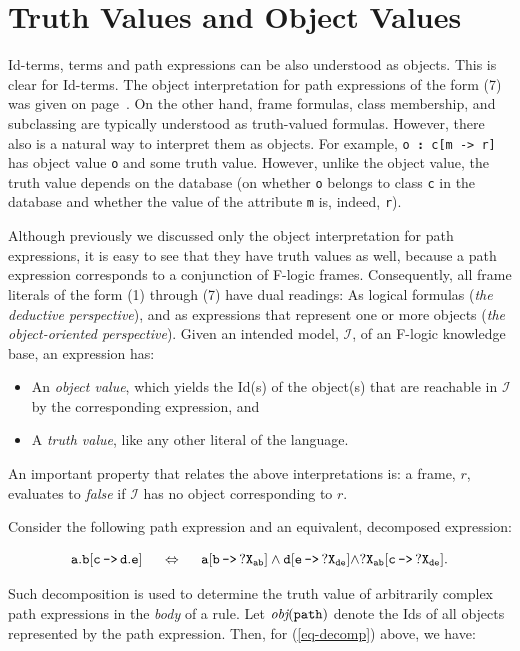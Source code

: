 \documentclass[11pt]{article}
\newcommand{\obj}{\textit{obj}\xspace}
\newcommand{\db}[1]{\ensuremath{\mathcal{#1}}}
\newcommand{\isa}{\,{\bf{:}}\,}
\newcommand{\mvd}{{\mbox{\tt \,->\,}}}  %
\newcommand{\fl}{\mbox{F-logic}\xspace}
\begin{document}
\section{Truth Values and Object Values} \label{sec-references}


Id-terms, terms and path expressions can be also understood as
objects. This is clear for Id-terms. The object interpretation for path
expressions of the form (7) was given on page~\pageref{eq-path-fun}.
On the other hand, frame formulas, class membership, and subclassing
are typically understood as truth-valued formulas.
However, there
also is a natural way to interpret them as objects.  For example,
{\tt o{\isa}c[m{\mvd}r]} has object value {\tt o} and some truth value.
However, unlike the object value, the truth value depends on the database
(on whether {\tt o} belongs to class {\tt c} in the database and whether
the value of the attribute {\tt m} is, indeed, {\tt r}).

Although previously we discussed only the object interpretation for path
expressions, it is easy to see that they have truth values as well, because
a path expression corresponds to a conjunction of F-logic frames.
Consequently, all frame literals of the form (1) through (7) have dual
readings: As logical formulas (\emph{the deductive perspective}), and as
expressions that represent one or more objects (\emph{the object-oriented
  perspective}).  Given an intended model, \db I, of an \fl knowledge base, an
expression has:
\begin{itemize}
\item An \emph{object value}, which yields the Id(s) of the object(s)
  that are reachable in \db I by the corresponding expression, and 
\item A \emph{truth value}, like any other literal of the
  language. 
\end{itemize}
An important property that relates the above interpretations is: a
frame, $r$, evaluates to \emph{false} if \db I has no object
corresponding to $r$.


Consider the following path expression and an equivalent, decomposed
expression:

\begin{equation}\label{eq-decomp}
\tt
a.b[c\mvd d.e] \quad\ \Leftrightarrow \quad\  a[b\mvd ?X_{ab}]
\land d[e\mvd ?X_{de}] \land ?X_{ab}[c\mvd ?X_{de}]. 
\end{equation}

\noindent
Such decomposition is used to determine the truth value of arbitrarily complex
path expressions in the \emph{body} of a rule.  Let $\tt \obj(path)$ denote
the Ids of all objects represented by the path expression. Then, for
(\ref{eq-decomp}) above, we have:
\end{document}
